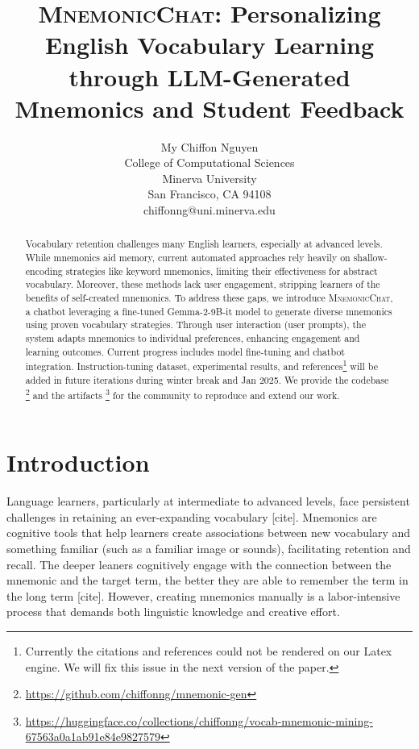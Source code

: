 \documentclass{article}
\title{\textsc{MnemonicChat}: Personalizing English Vocabulary Learning through LLM-Generated Mnemonics and Student Feedback}
\author{%
  My Chiffon Nguyen \\
  College of Computational Sciences \\
  Minerva University \\
  San Francisco, CA 94108 \\
  chiffonng@uni.minerva.edu
}
\begin{document}
\maketitle
\begin{abstract}
Vocabulary retention challenges many English learners, especially at advanced levels. While mnemonics aid memory, current automated approaches rely heavily on shallow-encoding strategies like keyword mnemonics, limiting their effectiveness for abstract vocabulary. Moreover, these methods lack user engagement, stripping learners of the benefits of self-created mnemonics. To address these gaps, we introduce \textsc{MnemonicChat}, a chatbot leveraging a fine-tuned Gemma-2-9B-it model to generate diverse mnemonics using proven vocabulary strategies. Through user interaction (user prompts), the system adapts mnemonics to individual preferences, enhancing engagement and learning outcomes. Current progress includes model fine-tuning and chatbot integration. Instruction-tuning dataset, experimental results, and references\footnote{Currently the citations and references could not be rendered on our Latex engine. We will fix this issue in the next version of the paper.} will be added in future iterations during winter break and Jan 2025. We provide the codebase \footnote{\href{https://github.com/chiffonng/mnemonic-gen}{https://github.com/chiffonng/mnemonic-gen}} and the artifacts \footnote{\href{https://huggingface.co/collections/chiffonng/vocab-mnemonic-mining-67563a0a1ab91e84e9827579}{https://huggingface.co/collections/chiffonng/vocab-mnemonic-mining-67563a0a1ab91e84e9827579}} for the community to reproduce and extend our work.
\end{abstract}

\section{Introduction} \label{sec:intro}
Language learners, particularly at intermediate to advanced levels, face persistent challenges in retaining an ever-expanding vocabulary [cite]. Mnemonics are cognitive tools that help learners create associations between new vocabulary and something familiar (such as a familiar image or sounds), facilitating retention and recall. The deeper leaners cognitively engage with the connection between the mnemonic and the target term, the better they are able to remember the term in the long term [cite]. However, creating mnemonics manually is a labor-intensive process that demands both linguistic knowledge and creative effort.
\end{document}
